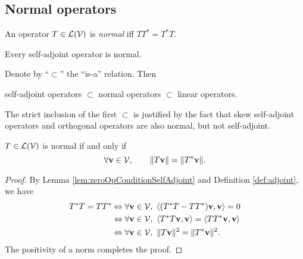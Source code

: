 \subsection{Normal operators}
\label{sec:normal-operators}

\begin{defn}
  \label{def:normalOps}
  An operator $T\in {\cal L}({\cal V})$
  is \emph{normal} iff $TT^*=T^*T$.
\end{defn}

\begin{coro}
  \label{coro:TTsIsNormal}
  Every self-adjoint operator is normal.
\end{coro}

\begin{rem}
  Denote by ``$\subset$'' the ``is-a'' relation.
  Then 
  \begin{center}
    self-adjoint operators $\subset$ normal operators
    $\subset$ linear operators.
  \end{center}
  The strict inclusion of the first $\subset$
  is justified by the fact
  that skew self-adjoint operators and orthogonal operators
  are also normal, but not self-adjoint.
\end{rem}

\begin{lem}
  \label{lem:normalOpCondition}
  $T\in {\cal L}({\cal V})$
  is normal if and only if
  \begin{equation}
    \label{eq:normalOpCondition}
    \forall \mathbf{v}\in {\cal V},\qquad
    \|T\mathbf{v}\| = \|T^*\mathbf{v}\|.
  \end{equation}
\end{lem}
\begin{proof}
  By Lemma \ref{lem:zeroOpConditionSelfAdjoint}
  and Definition \ref{def:adjoint},
  we have
  \begin{align*}
    T^*T=TT^* %
    &\Leftrightarrow
      \forall \mathbf{v}\in {\cal V},\ 
      \innerProd{(T^*T-TT^*)\mathbf{v}, \mathbf{v}}=0
    \\
    &\Leftrightarrow
      \forall \mathbf{v}\in {\cal V},\ 
      \innerProd{T^*T\mathbf{v}, \mathbf{v}}=\innerProd{TT^*\mathbf{v}, \mathbf{v}}
    \\
    &\Leftrightarrow
      \forall \mathbf{v}\in {\cal V},\ 
      \|T\mathbf{v}\|^2 = \|T^*\mathbf{v}\|^2.
  \end{align*}
  The positivity of a norm completes the proof.
\end{proof}

